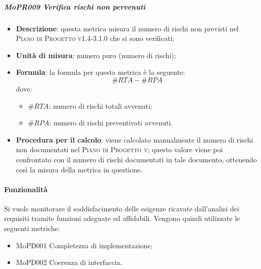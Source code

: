 \documentclass[../norme-di-progetto.tex]{subfiles}
\begin{document}
\subparagraph{MoPR009 Verifica rischi non pervenuti}
\begin{itemize}
  \item \textbf{Descrizione}: questa metrica misura il numero di rischi non previsti nel \textsc{Piano di Progetto v1.4-3.1.0} che si sono verificati;
  \item \textbf{Unità di misura}: numero puro (numero di rischi);
  \item \textbf{Formula}: la formula per questa metrica è la seguente:
  \begin{displaymath}
    \#RTA - \#RPA
  \end{displaymath}
  dove:
  \begin{itemize}
    \item $ \#RTA $: numero di rischi totali avvenuti;
    \item $ \#RPA $: numero di rischi preventivati avvenuti.
  \end{itemize}
    \item \textbf{Procedura per il calcolo}: viene calcolato manualmente il numero di rischi non documentati nel \textsc{Piano di Progetto v}; questo valore viene poi confrontato con il numero di rischi documentati in tale documento, ottenendo così la misura della metrica in questione.
\end{itemize}


\paragraph{Funzionalità}
Si vuole monitorare il soddisfacimento delle esigenze ricavate dall'analisi dei requisiti tramite funzioni adeguate ed affidabili. Vengono quindi utilizzate le seguenti metriche:
\begin{itemize}
  \item MoPD001 Completezza di implementazione;
  \item MoPD002 Coerenza di interfaccia.
\end{itemize}
\end{document}
